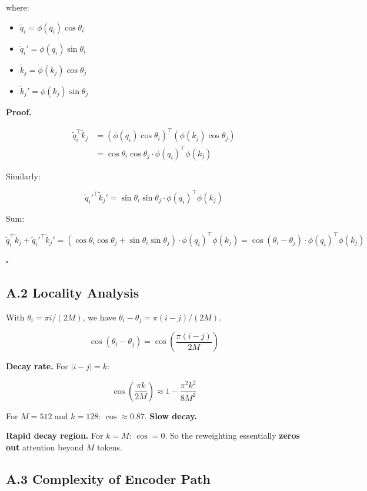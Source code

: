where:
\begin{itemize}
\item $\tilde{q}_i = \phi(q_i) \cos\theta_i$
\item $\tilde{q}_i' = \phi(q_i) \sin\theta_i$
\item $\tilde{k}_j = \phi(k_j) \cos\theta_j$
\item $\tilde{k}_j' = \phi(k_j) \sin\theta_j$

\end{itemize}
\textbf{Proof.}

\[
\begin{aligned}
\tilde{q}_i^\top \tilde{k}_j &= (\phi(q_i) \cos\theta_i)^\top (\phi(k_j) \cos\theta_j) \\
&= \cos\theta_i \cos\theta_j \cdot \phi(q_i)^\top \phi(k_j)
\end{aligned}
\]

Similarly:

\[
\tilde{q}_i'^\top \tilde{k}_j' = \sin\theta_i \sin\theta_j \cdot \phi(q_i)^\top \phi(k_j)
\]

Sum:

\[
\tilde{q}_i^\top \tilde{k}_j + \tilde{q}_i'^\top \tilde{k}_j' = (\cos\theta_i \cos\theta_j + \sin\theta_i \sin\theta_j) \cdot \phi(q_i)^\top \phi(k_j) = \cos(\theta_i - \theta_j) \cdot \phi(q_i)^\top \phi(k_j)
\]

$\square$

\subsection{A.2 Locality Analysis}

With $\theta_i = \pi i / (2 M)$, we have $\theta_i - \theta_j = \pi (i - j) / (2 M)$.

\[
\cos(\theta_i - \theta_j) = \cos\!\left(\frac{\pi (i-j)}{2M}\right)
\]

\textbf{Decay rate.} For $|i - j| = k$:

\[
\cos\!\left(\frac{\pi k}{2M}\right) \approx 1 - \frac{\pi^2 k^2}{8M^2}
\]

For $M = 512$ and $k = 128$: $\cos \approx 0.87$. \textbf{Slow decay.}

\textbf{Rapid decay region.} For $k = M$: $\cos = 0$. So the reweighting 
essentially \textbf{zeros out} attention beyond $M$ tokens.

\subsection{A.3 Complexity of Encoder Path}

